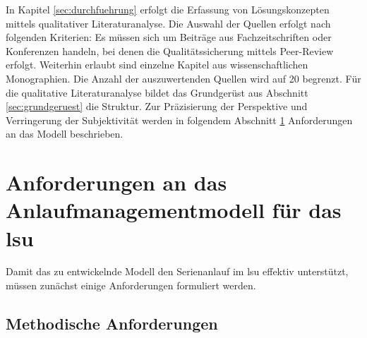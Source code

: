 
In Kapitel \ref{sec:durchfuehrung} erfolgt die Erfassung von Lösungskonzepten mittels qualitativer Literaturanalyse. Die Auswahl der Quellen erfolgt nach folgenden Kriterien:
Es müssen sich um Beiträge aus Fachzeitschriften oder Konferenzen handeln, bei denen die Qualitätssicherung mittels Peer-Review erfolgt. 
Weiterhin erlaubt sind einzelne Kapitel aus wissenschaftlichen Monographien. Die Anzahl der auszuwertenden Quellen wird auf 20 begrenzt. Für die qualitative Literaturanalyse bildet das Grundgerüst aus Abschnitt \ref{sec:grundgeruest} die Struktur. Zur Präzisierung der Perspektive und Verringerung der Subjektivität werden in folgendem Abschnitt \ref{sec:anforderungen} Anforderungen an das Modell beschrieben. 



\section{Anforderungen an das Anlaufmanagementmodell für das \gls{lsu}}\label{sec:anforderungen}
Damit das zu entwickelnde Modell den Serienanlauf im \gls{lsu} effektiv unterstützt, müssen zunächst einige Anforderungen formuliert werden. 

\subsection*{Methodische Anforderungen}


